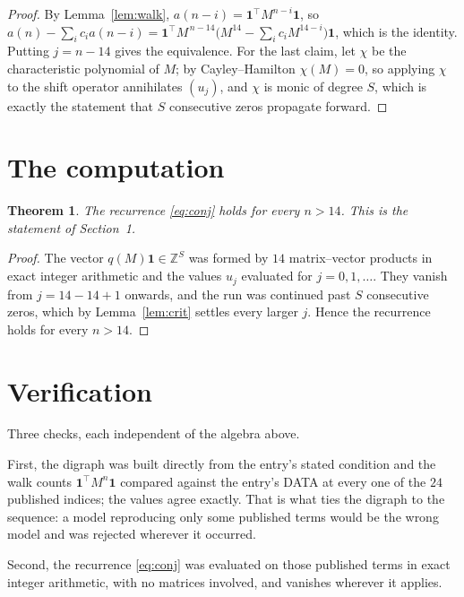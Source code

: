 \documentclass[11pt,a4paper]{article}
\theoremstyle{plain}
\newtheorem{theorem}{Theorem}
\theoremstyle{definition}
\begin{document}
\begin{proof}
By Lemma~\ref{lem:walk}, $a(n-i)=\mathbf{1}^{\!\top}M^{n-i}\mathbf{1}$, so
$a(n)-\sum_i c_i a(n-i)
=\mathbf{1}^{\!\top}M^{\,n-14}\bigl(M^{14}-\sum_i c_i M^{14-i}\bigr)
\mathbf{1}$, which is the identity. Putting $j=n-14$ gives the equivalence. For the
last claim, let $\chi$ be the characteristic polynomial of $M$; by Cayley--Hamilton
$\chi(M)=0$, so applying $\chi$ to the shift operator annihilates $(u_j)$, and $\chi$ is
monic of degree $S$, which is exactly the statement that $S$ consecutive zeros propagate
forward.
\end{proof}

\section{The computation}

\begin{theorem}
The recurrence \eqref{eq:conj} holds for every $n>14$. This is the statement of
Section~1.
\end{theorem}

\begin{proof}
The vector $q(M)\mathbf{1}\in\mathbb{Z}^{S}$ was formed by $14$ matrix--vector
products in exact integer arithmetic and the values $u_j$ evaluated for
$j=0,1,\dots$. They vanish from $j=14-14+1$ onwards, and the run was continued past
$S$ consecutive zeros, which by Lemma~\ref{lem:crit} settles every larger $j$. Hence the
recurrence holds for every $n>14$.
\end{proof}

\section{Verification}

Three checks, each independent of the algebra above.

First, the digraph was built directly from the entry's stated condition and the walk counts
$\mathbf{1}^{\!\top}M^{n}\mathbf{1}$ compared against the entry's DATA at every one of
the $24$ published indices; the values agree exactly. That is what ties the digraph to
the sequence: a model reproducing only some published terms would be the wrong model and
was rejected wherever it occurred.

Second, the recurrence \eqref{eq:conj} was evaluated on those published terms in exact
integer arithmetic, with no matrices involved, and vanishes wherever it applies.
\end{document}

